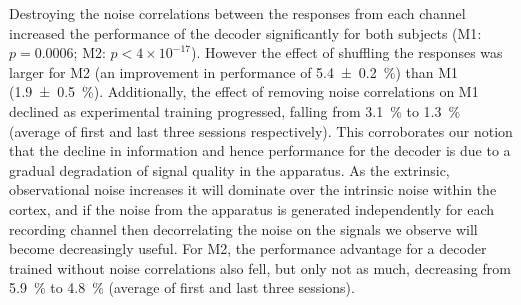 Destroying the noise correlations between the responses from each channel increased the performance of the decoder significantly for both subjects (\ac{M1}: $p=0.0006$; \ac{M2}: $p < 4 \times 10^{-17}$).
However the effect of shuffling the responses was larger for \ac{M2} (an improvement in performance of \SI{5.4\pm0.2}{\percent}) than \ac{M1} (\SI{+1.9\pm0.5}{\percent}).
Additionally, the effect of removing noise correlations on \ac{M1} declined as experimental training progressed, falling from \SI{3.1}{\percent} to \SI{1.3}{\percent} (average of first and last three sessions respectively).
This corroborates our notion that the decline in information and hence performance for the decoder is due to a gradual degradation of signal quality in the apparatus.
As the extrinsic, observational noise increases it will dominate over the intrinsic noise within the cortex, and if the noise from the apparatus is generated independently for each recording channel then decorrelating the noise on the signals we observe will become decreasingly useful.
For \ac{M2}, the performance advantage for a decoder trained without noise correlations also fell, but only not as much, decreasing from \SI{5.9}{\percent} to \SI{4.8}{\percent} (average of first and last three sessions).

%
%

